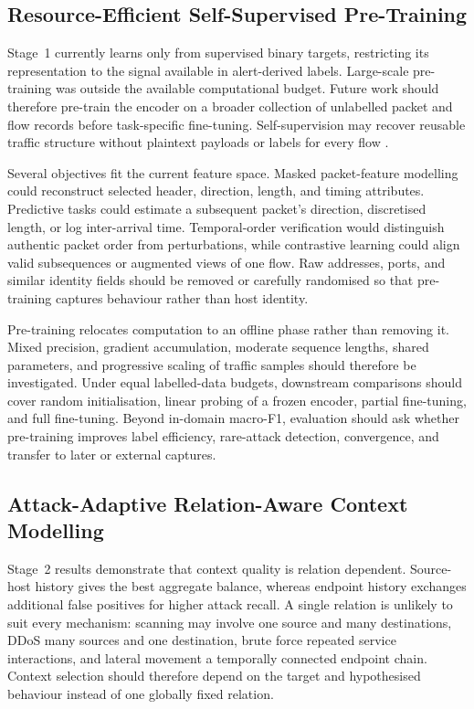 \documentclass[11pt,fleqn]{report}
\begin{document}
\subsection{Resource-Efficient Self-Supervised Pre-Training}
\label{subsubsec:future_pretraining}

Stage~1 currently learns only from supervised binary targets, restricting its representation to the signal available in alert-derived labels. Large-scale pre-training was outside the available computational budget. Future work should therefore pre-train the encoder on a broader collection of unlabelled packet and flow records before task-specific fine-tuning. Self-supervision may recover reusable traffic structure without plaintext payloads or labels for every flow
\cite{2024MAETraffic,Dong2025EncryptedPretrain}.

Several objectives fit the current feature space. Masked packet-feature modelling could reconstruct selected header, direction, length, and timing attributes. Predictive tasks could estimate a subsequent packet's direction, discretised length, or log inter-arrival time. Temporal-order verification would distinguish authentic packet order from perturbations, while contrastive learning could align valid subsequences or augmented views of one flow. Raw addresses, ports, and similar identity fields should be removed or carefully randomised so that pre-training captures behaviour rather than host identity.

Pre-training relocates computation to an offline phase rather than removing it. Mixed precision, gradient accumulation, moderate sequence lengths, shared parameters, and progressive scaling of traffic samples should therefore be investigated. Under equal labelled-data budgets, downstream comparisons should cover random initialisation, linear probing of a frozen encoder, partial fine-tuning, and full fine-tuning. Beyond in-domain macro-F1, evaluation should ask whether pre-training improves label efficiency, rare-attack detection, convergence, and transfer to later or external captures.

\subsection{Attack-Adaptive Relation-Aware Context Modelling}
\label{subsubsec:future_relation_aware_context}

Stage~2 results demonstrate that context quality is relation dependent. Source-host history gives the best aggregate balance, whereas endpoint history exchanges additional false positives for higher attack recall. A single relation is unlikely to suit every mechanism: scanning may involve one source and many destinations, DDoS many sources and one destination, brute force repeated service interactions, and lateral movement a temporally connected endpoint chain. Context selection should therefore depend on the target and hypothesised behaviour instead of one globally fixed relation.
\end{document}
